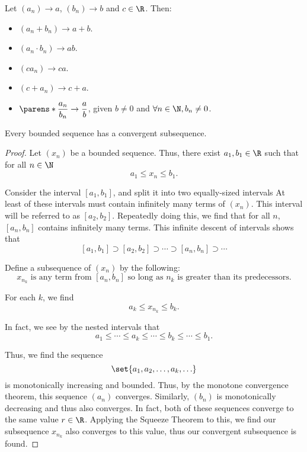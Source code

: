 \documentclass{article}
\begin{document}
\begin{thm}
  Let $(a_{n}) \to a$, $(b_{n}) \to b$ and $c \in \R$.
  Then:
  \begin{itemize}
    \item $(a_{n} + b_{n}) \to a + b$.
    \item $(a_{n} \cdot b_{n}) \to ab$.
    \item $(ca_{n}) \to ca$.
    \item $(c + a_{n}) \to c + a$.
    \item $\parens*{\dfrac{a_{n}}{b_{n}}} \to \dfrac{a}{b}$, given $b \ne 0$ and $\forall n \in \N, b_{n} \ne 0$.
  \end{itemize}

\end{thm}

\begin{thm}
  Every bounded sequence has a convergent subsequence.

  \begin{proof}
    Let $(x_{n})$ be a bounded sequence.
    Thus, there exist $a_{1}, b_{1} \in \R$ such that for all $n \in \N$
    \[
      a_{1} \le x_{n} \le b_{1}.
    \]

    Consider the interval $[a_{1}, b_{1}]$, and split it into two equally-sized intervals
    At least of these intervals must contain infinitely many terms of $(x_{n})$.
    This interval will be referred to as $[a_{2}, b_{2}]$.
    Repeatedly doing this, we find that for all $n$, $[a_{n}, b_{n}]$ contains infinitely many terms.
    This infinite descent of intervals shows that
    \[
      [a_{1}, b_{1}] \supset [a_{2}, b_{2}] \supset \cdots \supset [a_{n}, b_{n}] \supset \cdots
    \]

    Define a subsequence of $(x_{n})$ by the following:
    \[
      x_{n_{k}} \textrm{ is any term from } [a_{n}, b_{n}] \textrm{ so long as } n_{k} \textrm { is greater than its predecessors}.
    \]

    For each $k$, we find
    \[
      a_{k} \le x_{n_{k}} \le b_{k}.
    \]

    In fact, we see by the nested intervals that
    \[
      a_{1} \le \cdots \le a_{k} \le \cdots \le b_{k} \le \cdots \le b_{1}.
    \]

    Thus, we find the sequence
    \[
      \set{a_{1}, a_{2}, \ldots, a_{k}, \ldots}
    \]
    is monotonically increasing and bounded.
    Thus, by the monotone convergence theorem, this sequence $(a_{n})$ converges.
    Similarly, $(b_{n})$ is monotonically decreasing and thus also converges.
    In fact, both of these sequences converge to the same value $r \in \R$.
    Applying the Squeeze Theorem to this, we find our subsequence $x_{n_{k}}$ also converges to this value,
    thus our convergent subsequence is found.
  \end{proof}
\end{thm}
\end{document}
